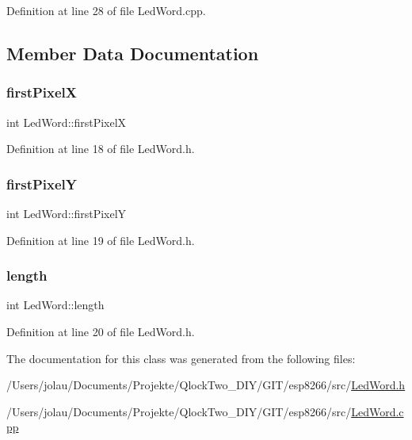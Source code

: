 Definition at line 28 of file Led\+Word.\+cpp.



\subsection{Member Data Documentation}
\mbox{\label{class_led_word_aa6052f570a53041fd3c301bd32b3f52a}} 
\subsubsection{\texorpdfstring{firstPixelX}{firstPixelX}}
{\footnotesize\ttfamily int Led\+Word\+::first\+PixelX\hspace{0.3cm}{\ttfamily [private]}}



Definition at line 18 of file Led\+Word.\+h.

\mbox{\label{class_led_word_a9b5fd331725bcdfcae12fec2ca1bd61e}} 
\subsubsection{\texorpdfstring{firstPixelY}{firstPixelY}}
{\footnotesize\ttfamily int Led\+Word\+::first\+PixelY\hspace{0.3cm}{\ttfamily [private]}}



Definition at line 19 of file Led\+Word.\+h.

\mbox{\label{class_led_word_a8c96d7c16c944052c6ef13f3b30e6385}} 
\subsubsection{\texorpdfstring{length}{length}}
{\footnotesize\ttfamily int Led\+Word\+::length\hspace{0.3cm}{\ttfamily [private]}}



Definition at line 20 of file Led\+Word.\+h.



The documentation for this class was generated from the following files\+:\begin{DoxyCompactItemize}
\item 
/\+Users/jolau/\+Documents/\+Projekte/\+Qlock\+Two\+\_\+\+D\+I\+Y/\+G\+I\+T/esp8266/src/\mbox{\hyperlink{_led_word_8h}{Led\+Word.\+h}}\item 
/\+Users/jolau/\+Documents/\+Projekte/\+Qlock\+Two\+\_\+\+D\+I\+Y/\+G\+I\+T/esp8266/src/\mbox{\hyperlink{_led_word_8cpp}{Led\+Word.\+cpp}}\end{DoxyCompactItemize}
